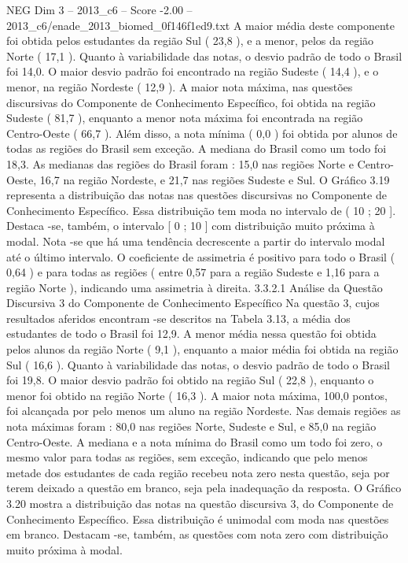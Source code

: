 \begin{textsample}{NEG Dim 3 – 2013\_c6 – Score -2.00 – 2013\_c6/enade\_2013\_biomed\_0f146f1ed9.txt}
A maior média deste componente foi obtida pelos estudantes da região Sul ( 23,8 ), e a menor, pelos da região Norte ( 17,1 ).
Quanto à variabilidade das notas, o desvio padrão de todo o Brasil foi 14,0.
O maior desvio padrão foi encontrado na região Sudeste ( 14,4 ), e o menor, na região Nordeste ( 12,9 ).
A maior nota máxima, nas questões discursivas do Componente de Conhecimento Específico, foi obtida na região Sudeste ( 81,7 ), enquanto a menor nota máxima foi encontrada na região Centro-Oeste ( 66,7 ).
Além disso, a nota mínima ( 0,0 ) foi obtida por alunos de todas as regiões do Brasil sem exceção.
A mediana do Brasil como um todo foi 18,3.
As medianas das regiões do Brasil foram : 15,0 nas regiões Norte e Centro-Oeste, 16,7 na região Nordeste, e 21,7 nas regiões Sudeste e Sul.
O Gráfico 3.19 representa a distribuição das notas nas questões discursivas no Componente de Conhecimento Específico.
Essa distribuição tem moda no intervalo de ( 10 ; 20 ].
Destaca -se, também, o intervalo [ 0 ; 10 ] com distribuição muito próxima à modal.
Nota -se que há uma tendência decrescente a partir do intervalo modal até o último intervalo.
O coeficiente de assimetria é positivo para todo o Brasil ( 0,64 ) e para todas as regiões ( entre 0,57 para a região Sudeste e 1,16 para a região Norte ), indicando uma assimetria à direita. 3.3.2.1 Análise da Questão Discursiva 3 do Componente de Conhecimento Específico Na questão 3, cujos resultados aferidos encontram -se descritos na Tabela 3.13, a média dos estudantes de todo o Brasil foi 12,9.
A menor média nessa questão foi obtida pelos alunos da região Norte ( 9,1 ), enquanto a maior média foi obtida na região Sul ( 16,6 ).
Quanto à variabilidade das notas, o desvio padrão de todo o Brasil foi 19,8.
O maior desvio padrão foi obtido na região Sul ( 22,8 ), enquanto o menor foi obtido na região Norte ( 16,3 ).
A maior nota máxima, 100,0 pontos, foi alcançada por pelo menos um aluno na região Nordeste.
Nas demais regiões as nota máximas foram : 80,0 nas regiões Norte, Sudeste e Sul, e 85,0 na região Centro-Oeste.
A mediana e a nota mínima do Brasil como um todo foi zero, o mesmo valor para todas as regiões, sem exceção, indicando que pelo menos metade dos estudantes de cada região recebeu nota zero nesta questão, seja por terem deixado a questão em branco, seja pela inadequação da resposta.
O Gráfico 3.20 mostra a distribuição das notas na questão discursiva 3, do Componente de Conhecimento Específico.
Essa distribuição é unimodal com moda nas questões em branco.
Destacam -se, também, as questões com nota zero com distribuição muito próxima à modal.

\end{textsample}
